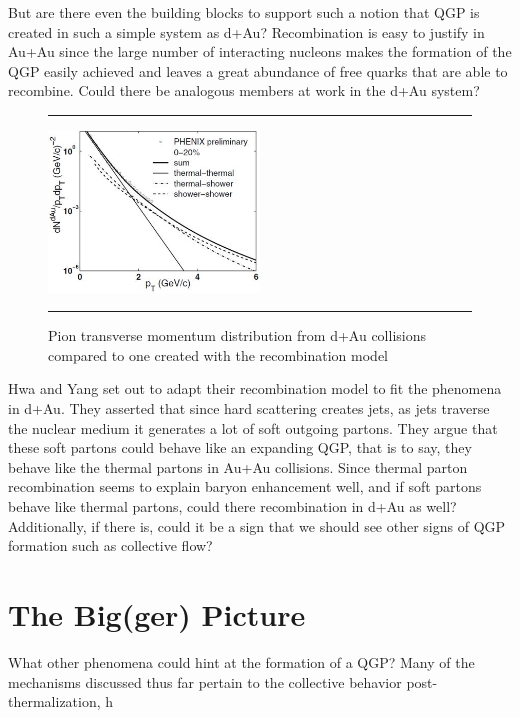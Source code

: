 But are there even the building blocks to support such a notion that QGP is created in such a simple system as d+Au? Recombination is easy to justify in Au+Au since the large number of interacting nucleons makes the formation of the QGP easily achieved and leaves a great abundance of free quarks that are able to recombine. Could there be analogous members at work in the d+Au system? 
\begin{figure}[b!]
  \centering
    \rule{35em}{0.5pt}
    \includegraphics[width=0.5\textwidth]{prevplots/daurecomb.JPG}

  \caption[Pion transverse momentum distribution from d+Au collisions compared to one created with the recombination model]{Pion transverse momentum distribution from d+Au collisions compared to one created with the recombination model}
  \label{fig:daaaratios}
    \rule{35em}{0.5pt}
\end{figure}
Hwa and Yang set out to adapt their recombination model to fit the phenomena in d+Au\citep{PhysRevLett.93.082302}. They asserted that since hard scattering creates jets, as jets traverse the nuclear medium it generates a lot of soft outgoing partons. They argue that these soft partons could behave like an expanding QGP, that is to say, they behave like the thermal partons in Au+Au collisions. Since thermal parton recombination seems to explain baryon enhancement well, and if soft partons behave like thermal partons, could there recombination in d+Au as well? Additionally, if there is, could it be a sign that we should see other signs of QGP formation such as collective flow? 

\section{The Big(ger) Picture}
What other phenomena could hint at the formation of a QGP? Many of the mechanisms discussed thus far pertain to the collective behavior post-thermalization, h

